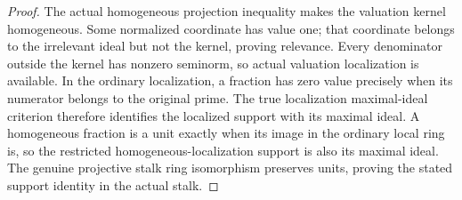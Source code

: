 \begin{proof}
The actual homogeneous projection inequality makes the valuation kernel
homogeneous. Some normalized coordinate has value one; that coordinate
belongs to the irrelevant ideal but not the kernel, proving relevance.
Every denominator outside the kernel has nonzero seminorm, so actual
valuation localization is available. In the ordinary localization, a
fraction has zero value precisely when its numerator belongs to the
original prime. The true localization maximal-ideal criterion therefore
identifies the localized support with its maximal ideal. A homogeneous
fraction is a unit exactly when its image in the ordinary local ring is,
so the restricted homogeneous-localization support is also its maximal
ideal. The genuine projective stalk ring isomorphism preserves units,
proving the stated support identity in the actual stalk.
\end{proof}

